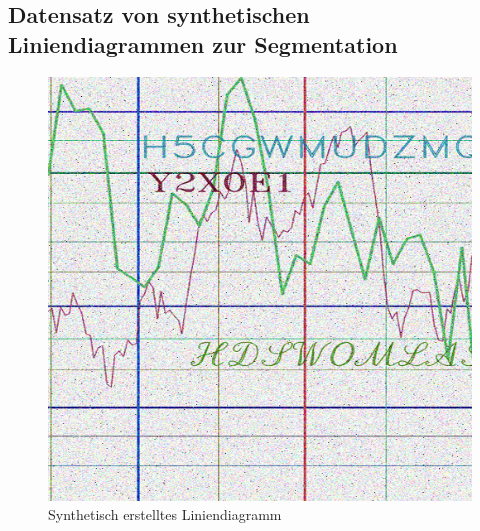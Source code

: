 \clearpage

\subsection{Datensatz von synthetischen Liniendiagrammen zur Segmentation}
\label{ch:genlines}

\begin{figure}[h!] %
    \centering
    \begin{minipage}{0.475\textwidth} %
        \centering
        \includegraphics[width=\linewidth]{Methodik/img/lines_synthetic.png}
        \caption{ Synthetisch erstelltes Liniendiagramm}
        \label{fig:lines_synthetic}
    \end{minipage}\hfill %
    \begin{minipage}{0.475\textwidth} %
        \centering

\end{minipage}
\end{figure}
